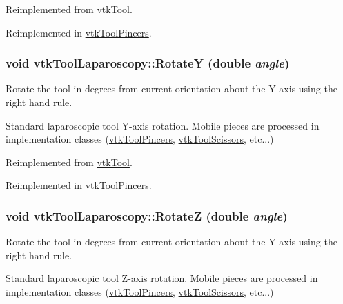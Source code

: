 Reimplemented from \hyperlink{classvtkTool_a34b408444b681853b5dabbda6b971223}{vtkTool}.



Reimplemented in \hyperlink{classvtkToolPincers_ac6b80a0c7a43ae67cfafbe29772b41d0}{vtkToolPincers}.

\hypertarget{classvtkToolLaparoscopy_ae0245eaa9aa765a675da5135c4af422a}{
\subsubsection[{RotateY}]{\setlength{\rightskip}{0pt plus 5cm}void vtkToolLaparoscopy::RotateY (double {\em angle})}}
\label{classvtkToolLaparoscopy_ae0245eaa9aa765a675da5135c4af422a}


Rotate the tool in degrees from current orientation about the Y axis using the right hand rule. 

Standard laparoscopic tool Y-\/axis rotation. Mobile pieces are processed in implementation classes (\hyperlink{classvtkToolPincers}{vtkToolPincers}, \hyperlink{classvtkToolScissors}{vtkToolScissors}, etc...) 

Reimplemented from \hyperlink{classvtkTool_ad37e6208805e0fddd07dfc783a70fceb}{vtkTool}.



Reimplemented in \hyperlink{classvtkToolPincers_aa2a15405aa65c96dd971e3c06d98d197}{vtkToolPincers}.

\hypertarget{classvtkToolLaparoscopy_a3849ce4caa8283696433cb1ac0466bc5}{
\subsubsection[{RotateZ}]{\setlength{\rightskip}{0pt plus 5cm}void vtkToolLaparoscopy::RotateZ (double {\em angle})}}
\label{classvtkToolLaparoscopy_a3849ce4caa8283696433cb1ac0466bc5}


Rotate the tool in degrees from current orientation about the Y axis using the right hand rule. 

Standard laparoscopic tool Z-\/axis rotation. Mobile pieces are processed in implementation classes (\hyperlink{classvtkToolPincers}{vtkToolPincers}, \hyperlink{classvtkToolScissors}{vtkToolScissors}, etc...) 

